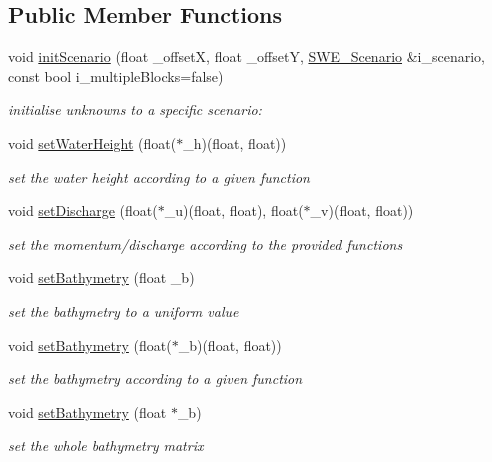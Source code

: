 \subsection*{Public Member Functions}
\begin{DoxyCompactItemize}
\item 
void \hyperlink{classSWE__Block_a46b715c584468a5daa975ec1eb1ab947}{init\-Scenario} (float \-\_\-offset\-X, float \-\_\-offset\-Y, \hyperlink{classSWE__Scenario}{S\-W\-E\-\_\-\-Scenario} \&i\-\_\-scenario, const bool i\-\_\-multiple\-Blocks=false)
\begin{DoxyCompactList}\small\item\em initialise unknowns to a specific scenario\-: \end{DoxyCompactList}\item 
void \hyperlink{classSWE__Block_a6481ce1c80a219fbefefdcbd13ed3688}{set\-Water\-Height} (float($\ast$\-\_\-h)(float, float))
\begin{DoxyCompactList}\small\item\em set the water height according to a given function \end{DoxyCompactList}\item 
void \hyperlink{classSWE__Block_a245332c325fd0ff6a7e9c2d3d9454970}{set\-Discharge} (float($\ast$\-\_\-u)(float, float), float($\ast$\-\_\-v)(float, float))
\begin{DoxyCompactList}\small\item\em set the momentum/discharge according to the provided functions \end{DoxyCompactList}\item 
void \hyperlink{classSWE__Block_af2ab34b138a14f2c295849f3b2acc5f3}{set\-Bathymetry} (float \-\_\-b)
\begin{DoxyCompactList}\small\item\em set the bathymetry to a uniform value \end{DoxyCompactList}\item 
void \hyperlink{classSWE__Block_ad4214fcfd102a4c167d274ad87d9dd90}{set\-Bathymetry} (float($\ast$\-\_\-b)(float, float))
\begin{DoxyCompactList}\small\item\em set the bathymetry according to a given function \end{DoxyCompactList}\item 
void \hyperlink{classSWE__Block_ab2e750bb5e8a952cd9f771054cb4e7b0}{set\-Bathymetry} (float $\ast$\-\_\-b)
\begin{DoxyCompactList}\small\item\em set the whole bathymetry matrix \end{DoxyCompactList}\item 

\end{DoxyCompactItemize}
